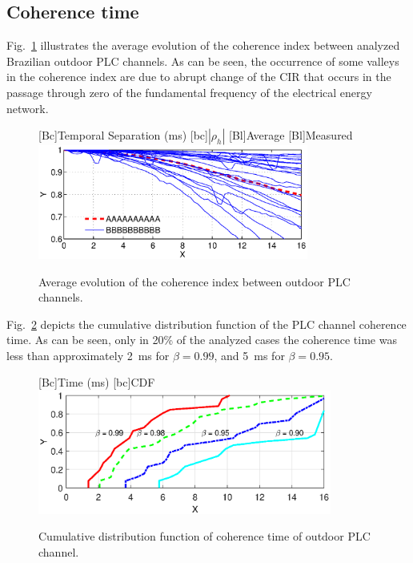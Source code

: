 \documentclass[journal]{IEEEtran}
\newcommand{\tamfig}{3.5in}    %
\begin{document}
	\subsection{Coherence time}\label{sec-tempodecoerencia} 
	Fig.~\ref{Fig:TCmedio} illustrates the average evolution of the coherence index between analyzed Brazilian outdoor \ac{PLC} channels. As can be seen, the occurrence of some valleys in the coherence index are due to abrupt change of the \ac{CIR} that occurs in the passage through zero of the fundamental frequency of the electrical energy network.  
	\begin{figure}[!htp]
		\begin{centering}
			[Bc]{Temporal Separation (ms)}    
			[bc]{$|\rho_h|$}
			[Bl]{Average}
			[Bl]{Measured}
			\includegraphics[width=\tamfig]{Figuras/TCmedio.eps}
			\caption{Average evolution of the coherence index between outdoor PLC channels.}
			\label{Fig:TCmedio}
		\end{centering}
	\end{figure}
	
	Fig.~\ref{Fig:TC_CDF} depicts the cumulative distribution function of the \ac{PLC} channel coherence time. As can be seen,  only in 20\% of the analyzed cases the coherence time was less than approximately 2~ms for $\beta = 0.99$, and 5~ms for $\beta = 0.95$. 
	\begin{figure}[!htp]
		\begin{centering}
			[Bc]{Time (ms)}    
			[bc]{CDF}
			\includegraphics[width=3.8in]{Figuras/TC_CDF.eps}
			\caption{Cumulative distribution function of coherence time of outdoor PLC channel.}
			\label{Fig:TC_CDF}
		\end{centering}
	\end{figure}
	
\end{document}
